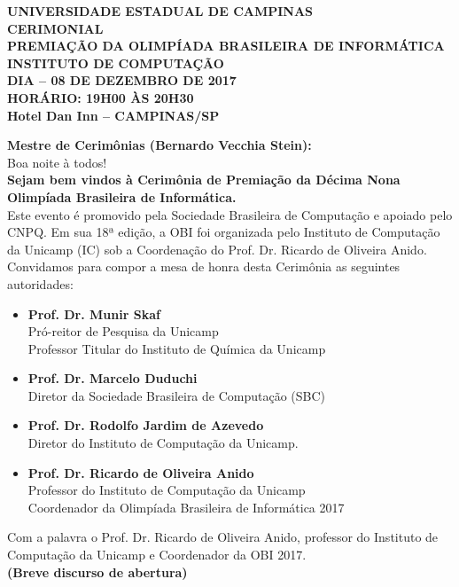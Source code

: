\documentclass{article}
\begin{document}
\setlength{\parindent}{0pt}

\begin{center}
    \textbf{
        UNIVERSIDADE ESTADUAL DE CAMPINAS\\
        CERIMONIAL\\
        \bigskip
         PREMIAÇÃO DA OLIMPÍADA BRASILEIRA DE INFORMÁTICA\\
        INSTITUTO DE COMPUTAÇÃO\\
        DIA – 08 DE DEZEMBRO DE 2017\\
        HORÁRIO: 19H00 ÀS 20H30\\
        Hotel Dan Inn – CAMPINAS/SP 
    }
\end{center}

\textbf{Mestre de Cerimônias (Bernardo Vecchia Stein):}\\
Boa noite à todos!\\
\textbf{Sejam bem vindos à Cerimônia de Premiação da Décima Nona Olimpíada Brasileira de Informática.}\\
\color{blue}Este evento é promovido pela Sociedade Brasileira de Computação e apoiado pelo CNPQ. Em sua 18ª edição, a OBI foi organizada pelo Instituto de Computação da Unicamp (IC) sob a Coordenação do Prof. Dr. Ricardo de Oliveira Anido.\\
\color{black}
Convidamos para compor a mesa de honra desta Cerimônia as seguintes autoridades:
\begin{itemize}
\item \textbf{Prof. Dr. Munir Skaf}\\
Pró-reitor de Pesquisa da Unicamp\\
Professor Titular do Instituto de Química da Unicamp

\item \textbf{Prof. Dr. Marcelo Duduchi}\\
Diretor da Sociedade Brasileira de Computação (SBC)

\item \textbf{Prof. Dr. Rodolfo Jardim de Azevedo}\\
Diretor do Instituto de Computação da Unicamp.
\item \textbf{Prof. Dr. Ricardo de Oliveira Anido}\\
Professor do Instituto de Computação da Unicamp\\
Coordenador da Olimpíada Brasileira de Informática 2017
\end{itemize}

Com a palavra o Prof. Dr. Ricardo de Oliveira Anido, professor do Instituto de Computação da Unicamp e Coordenador da OBI 2017.\\
\color{red}\textbf{(Breve discurso de abertura)}\color{black}\\
\end{document}
